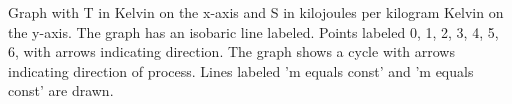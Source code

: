 Graph with T in Kelvin on the x-axis and S in kilojoules per kilogram Kelvin on the y-axis.  
The graph has an isobaric line labeled.  
Points labeled 0, 1, 2, 3, 4, 5, 6, with arrows indicating direction.  
The graph shows a cycle with arrows indicating direction of process.  
Lines labeled 'm equals const' and 'm equals const' are drawn.